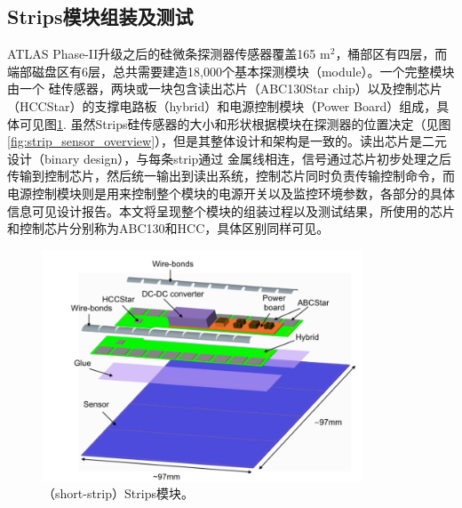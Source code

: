 \subsection{Strips模块组装及测试}
ATLAS Phase-II升级之后的硅微条探测器传感器覆盖165 m$^2$，桶部区有四层，而端部磁盘区有6层，总共需要建造18,000个基本探测模块（module）。一个完整模块由一个
硅传感器，两块或一块包含读出芯片（ABC130Star chip）以及控制芯片（HCCStar）的支撑电路板（hybrid）和电源控制模块（Power Board）组成，具体可见图\ref{fig:strips_module}.
虽然Strips硅传感器的大小和形状根据模块在探测器的位置决定（见图\ref{fig:strip_sensor_overview}），但是其整体设计和架构是一致的。读出芯片是二元设计（binary design），与每条strip通过
金属线相连，信号通过芯片初步处理之后传输到控制芯片，然后统一输出到读出系统，控制芯片同时负责传输控制命令，而电源控制模块则是用来控制整个模块的电源开关以及监控环境参数，各部分的具体
信息可见设计报告\cite{Collaboration:2017mtb}。本文将呈现整个模块的组装过程以及测试结果，所使用的芯片和控制芯片分别称为ABC130和HCC，具体区别同样可见\cite{Collaboration:2017mtb}。

\begin{figure}[h]
\centering
 \includegraphics[width=0.85\textwidth]{fig/strips_module_3d.png}
 \caption{（short-strip）Strips模块。}
 \label{fig:strips_module}
\end{figure}

